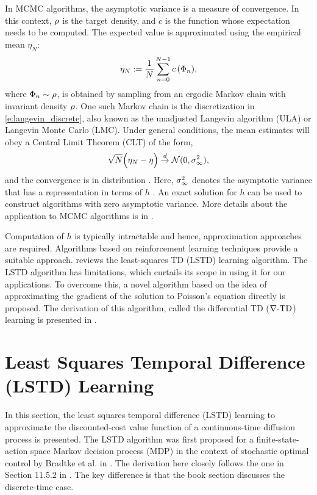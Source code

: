In MCMC algorithms, the asymptotic variance is a measure of convergence. In this context, $\rho$ is the target density, and $c$ is the function whose expectation needs to be computed. The expected value is approximated using the empirical mean $\eta_N$:
\begin{equation} \eta_N := \frac{1}{N} \sum_{n=0}^{N-1} c\,(\Phi_n),\end{equation}
where $\Phi_n \sim \rho$, is obtained by sampling from an ergodic Markov chain with invariant density $\rho$. One such Markov chain is the discretization in \eqref{e:langevin_discrete}, also known as the unadjusted Langevin algorithm (ULA) or Langevin Monte Carlo (LMC). Under general conditions, the mean estimates will obey a Central Limit Theorem (CLT) of the form,
\begin{equation}
\sqrt{N} \Bigl( \eta_N - \eta \Bigr) \overset{d}{\to} \mathcal{N}(0,\sigma_\infty ^2),
\end{equation}
and the convergence is in distribution \cite{MT,bha82}. Here, $\sigma_\infty^2$ denotes the asymptotic variance that has a representation in terms of $h$ \cite{glymey96a,MT,asmgly07}. An exact solution for $h$ can be used to construct algorithms with zero asymptotic variance. More details about the application to MCMC algorithms is in . 

Computation of $h$ is typically intractable and hence, approximation approaches are required. Algorithms based on reinforcement learning techniques provide a suitable approach.  reviews the least-squares TD (LSTD) learning algorithm. The LSTD algorithm has limitations, which curtails its scope in using it for our applications. To overcome this, a novel algorithm based on the idea of approximating the gradient of the solution to Poisson's equation directly is proposed. The derivation of this algorithm, called the differential TD ($\nabla\text{-TD}$) learning is presented in . 

\section{Least Squares Temporal Difference (LSTD) Learning} 
\label{s:lstd}
In this section, the least squares temporal difference (LSTD) learning to approximate the discounted-cost value function of a continuous-time diffusion process is presented.  The LSTD algorithm was first proposed for a finite-state-action space Markov decision process (MDP) in the context of stochastic optimal control  by Bradtke et al. in \cite{brabar96}. The derivation here closely follows the one in Section 11.5.2 in \cite{ctcn}. The key difference is that the book section discusses the discrete-time case. 

